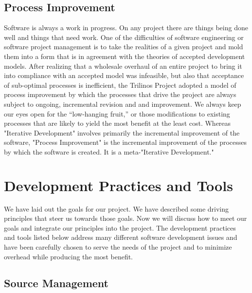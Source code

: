 \documentclass[12pt,relax]{article}
\begin{document}
\subsection{Process Improvement}

Software is always a work in progress.  On any project there are things
being done well and things that need work.  One of the difficulties of 
software engineering or software project management is to take the realities
of a given project and mold them into a form that is in agreement with the
theories of accepted development models.  After realizing that a wholesale 
overhaul of an entire project to bring it into compliance with an accepted
model was infeasible, but also that acceptance of sub-optimal processes is
inefficient, the Trilinos Project adopted a model of process improvement by
which the processes that drive the project are always subject to ongoing,
incremental revision and and improvement.  We always keep our eyes open for the 
``low-hanging fruit,'' or those modifications to existing processes that are
likely to yield the most benefit at the least cost.  Whereas "Iterative
Development" involves primarily the incremental improvement of the software,
"Process Improvement" is the incremental improvement of the processes by which
the software is created.  It is a meta-"Iterative Development."

\clearpage


\section{Development Practices and Tools}
\label{Section:Development Practices and Tools}

We have laid out the goals for our project.  We have described some driving
principles that steer us towards those goals.  Now we will discuss how to meet 
our goals and integrate our principles into the project.  The development
practices and tools listed below address many different software development
issues and have been carefully chosen to serve the needs of the project and to
minimize overhead while producing the most benefit.


\subsection{Source Management}
\end{document}
